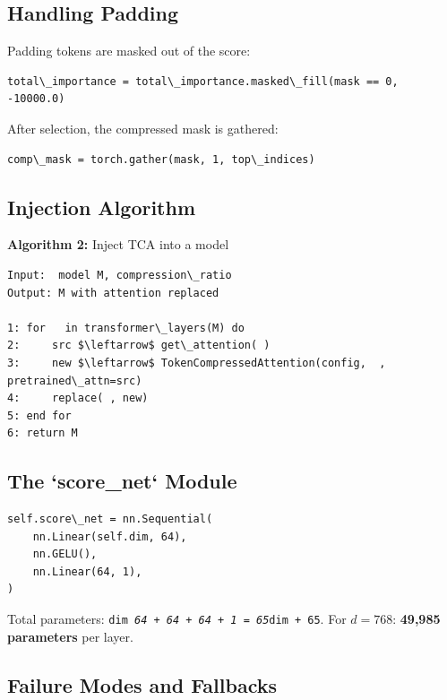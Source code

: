 \subsection{Handling Padding}

Padding tokens are masked out of the score:

\begin{lstlisting}
total\_importance = total\_importance.masked\_fill(mask == 0, -10000.0)
\end{lstlisting}

After selection, the compressed mask is gathered:

\begin{lstlisting}
comp\_mask = torch.gather(mask, 1, top\_indices)
\end{lstlisting}

\subsection{Injection Algorithm}

\textbf{Algorithm 2:} Inject TCA into a model
\begin{lstlisting}
Input:  model M, compression\_ratio  
Output: M with attention replaced

1: for   in transformer\_layers(M) do
2:     src $\leftarrow$ get\_attention( )
3:     new $\leftarrow$ TokenCompressedAttention(config,  , pretrained\_attn=src)
4:     replace( , new)
5: end for
6: return M
\end{lstlisting}

\subsection{The `score\_net` Module}

\begin{lstlisting}
self.score\_net = nn.Sequential(
    nn.Linear(self.dim, 64),
    nn.GELU(),
    nn.Linear(64, 1),
)
\end{lstlisting}

Total parameters: \texttt{dim \textit{ 64 + 64 + 64 + 1 = 65}dim + 65}. For $d = 768$: 
\textbf{49,985 parameters} per layer.

\subsection{Failure Modes and Fallbacks}

